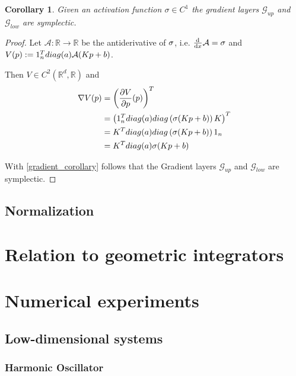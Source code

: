 \documentclass[twoside,a4paper]{article}
\newtheorem{corollary}{Corollary}
\begin{document}
\begin{corollary}
	Given an activation function $\sigma \in C^1$ the gradient layers $\mathcal{G}_{up}$
	and $\mathcal{G}_{low}$ are symplectic.
\end{corollary}
\begin{proof}
	Let $\mathcal{A}: \mathbb{R} \to \mathbb{R}$ be the antiderivative of $\sigma$, 
	i.e. $\frac{\mathrm{d}^{}}{\mathrm{d}x} \mathcal{A} = \sigma$ and
	$V(p) := 1_{n}^Tdiag(a)\mathcal{A}(Kp+b)$.

	Then $V \in C^2(\mathbb{R}^d, \mathbb{R})$ and
	\begin{align*}
		\nabla V(p) &= \left(\frac{\partial V}{\partial p}(p)\right)^T \\
		&= \left(1_n^Tdiag(a)diag\left(\sigma(Kp+b)\right)K\right)^T \\
		&= K^Tdiag(a)diag\left(\sigma(Kp+b)\right)1_n \\
		&= K^Tdiag(a)\sigma(Kp+b)
	\end{align*}

	With \cref{gradient_corollary} follows that the Gradient layers
	$\mathcal{G}_{up}$ and $\mathcal{G}_{low}$ are symplectic.
\end{proof}


\subsection{Normalization}




\section{Relation to geometric integrators}

\section{Numerical experiments}

\subsection{Low-dimensional systems}

\subsubsection{Harmonic Oscillator}
\end{document}
